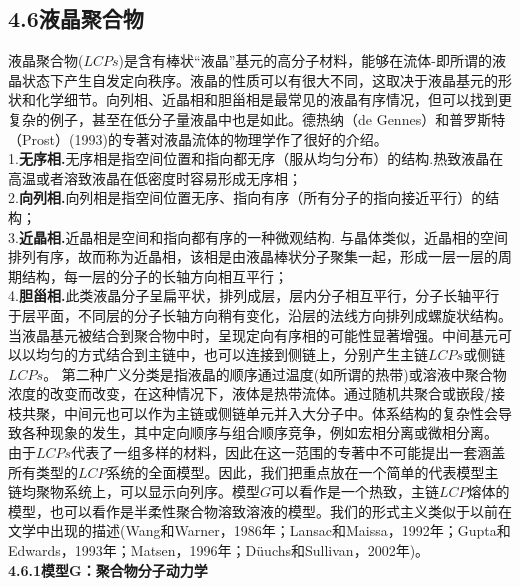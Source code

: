 \subsection{4.6液晶聚合物}

液晶聚合物($LCPs$)是含有棒状“液晶”基元的高分子材料，能够在流体-即所谓的液晶状态下产生自发定向秩序。液晶的性质可以有很大不同，这取决于液晶基元的形状和化学细节。向列相、近晶相和胆甾相是最常见的液晶有序情况，但可以找到更复杂的例子，甚至在低分子量液晶中也是如此。德热纳（de Gennes）和普罗斯特（Prost）(1993)的专著对液晶流体的物理学作了很好的介绍。\\

1.\textbf{无序相.}无序相是指空间位置和指向都无序（服从均匀分布）的结构.热致液晶在高温或者溶致液晶在低密度时容易形成无序相；\\

2.\textbf{向列相.}向列相是指空间位置无序、指向有序（所有分子的指向接近平行）的结构；\\

3.\textbf{近晶相.}近晶相是空间和指向都有序的一种微观结构. 与晶体类似，近晶相的空间排列有序，故而称为近晶相，该相是由液晶棒状分子聚集一起，形成一层一层的周期结构，每一层的分子的长轴方向相互平行；\\

4.\textbf{胆甾相.}此类液晶分子呈扁平状，排列成层，层内分子相互平行，分子长轴平行于层平面，不同层的分子长轴方向稍有变化，沿层的法线方向排列成螺旋状结构。\\

当液晶基元被结合到聚合物中时，呈现定向有序相的可能性显著增强。中间基元可以以均匀的方式结合到主链中，也可以连接到侧链上，分别产生主链$LCPs$或侧链$LCPs$。 第二种广义分类是指液晶的顺序通过温度(如所谓的热带)或溶液中聚合物浓度的改变而改变，在这种情况下，液体是热带流体。通过随机共聚合或嵌段/接枝共聚，中间元也可以作为主链或侧链单元并入大分子中。体系结构的复杂性会导致各种现象的发生，其中定向顺序与组合顺序竞争，例如宏相分离或微相分离。\\

由于$LCPs$代表了一组多样的材料，因此在这一范围的专著中不可能提出一套涵盖所有类型的$LCP$系统的全面模型。因此，我们把重点放在一个简单的代表模型主链均聚物系统上，可以显示向列序。模型$G$可以看作是一个热致，主链$LCP$熔体的模型，也可以看作是半柔性聚合物溶致溶液的模型。我们的形式主义类似于以前在文学中出现的描述(Wang和Warner，1986年；Lansac和Maissa，1992年；Gupta和Edwards，1993年；Matsen，1996年；Düuchs和Sullivan，2002年)。\\


\textbf{4.6.1模型G：聚合物分子动力学}


